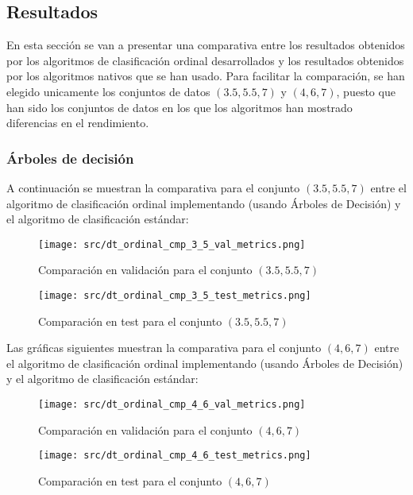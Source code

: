 \subsection{Resultados}
En esta sección se van a presentar una comparativa entre los resultados obtenidos por los algoritmos de clasificación ordinal desarrollados y los resultados obtenidos por los algoritmos nativos que se han usado. Para facilitar la comparación, se han elegido unicamente los conjuntos de datos $(3.5,5.5,7)$  y $(4,6,7)$, puesto que han sido los conjuntos de datos en los que los algoritmos han mostrado diferencias en el rendimiento.

\subsubsection*{Árboles de decisión}
A continuación se muestran la comparativa para el conjunto $(3.5,5.5,7)$ entre el algoritmo de clasificación ordinal implementando  (usando Árboles de Decisión) y el algoritmo de clasificación estándar:
\begin{figure}[H]
    \centering
    \texttt{[image: src/dt\_ordinal\_cmp\_3\_5\_val\_metrics.png]}
    \caption{Comparación en validación para el conjunto  $(3.5,5.5,7)$ }
    \label{fig:dt_ordin_val_cmp_1}
\end{figure}
\begin{figure}[H]
    \centering
    \texttt{[image: src/dt\_ordinal\_cmp\_3\_5\_test\_metrics.png]}
    \caption{Comparación en test para el conjunto  $(3.5,5.5,7)$}
    \label{fig:dt_ordint_test_cmp_1}
\end{figure}
Las gráficas siguientes muestran la comparativa para el conjunto $(4,6,7)$ entre el algoritmo de clasificación ordinal implementando  (usando Árboles de Decisión) y el algoritmo de clasificación estándar:
\begin{figure}[H]
    \centering
    \texttt{[image: src/dt\_ordinal\_cmp\_4\_6\_val\_metrics.png]}
    \caption{Comparación en validación para el conjunto $(4,6,7)$}
    \label{fig:dt_ordin_val_cmp_2}
\end{figure}
\begin{figure}[H]
    \centering
    \texttt{[image: src/dt\_ordinal\_cmp\_4\_6\_test\_metrics.png]}
    \caption{Comparación en test para el conjunto  $(4,6,7)$}
    \label{fig:dt_ordint_test_cmp_2}
\end{figure}
